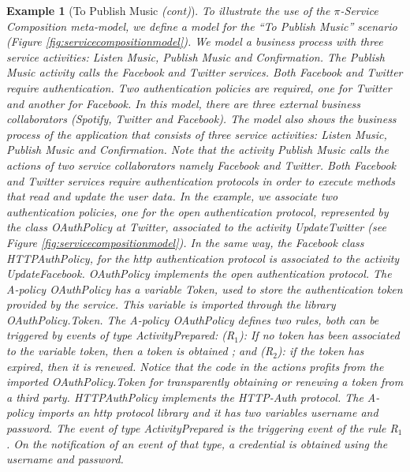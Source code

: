 \documentclass[12pt,twoside]{article}
\theoremstyle{plain}
\theoremstyle{plain}
\newtheorem{example}{Example}
\begin{document}
\begin{multicols}{2}
\begin{example}[To Publish Music \textit{(cont)}]\label{ex:toPublicMusic4}
To illustrate the use of the $\pi$-Service Composition meta-model, we define a model for the ``To Publish Music'' scenario (Figure \ref{fig:servicecompositionmodel}).
 We model a business process with three service activities: {\em Listen Music}, {\em Publish Music} and {\em Confirmation}.
The {\em Publish Music} activity calls the {\em Facebook} and {\em Twitter} services.
Both {\em Facebook} and {\em Twitter} require authentication.
Two authentication policies are required, one for {\em Twitter} and another for {\em Facebook}.
In this model, there are three external business collaborators ({\em Spotify, Twitter} and {\em Facebook}).
The model also shows the business process of the application that consists of three service activities: {\em Listen Music}, {\em Publish Music} and {\em Confirmation}.
Note that  the activity {\em Publish Music} calls the actions of two service collaborators namely {\em Facebook} and {\em Twitter}.
Both {\em Facebook} and {\em Twitter} services require authentication protocols in order to execute methods that read and update the user data.
In the example, we  associate two authentication policies, one for the open authentication protocol, represented by the class {\sf\small OAuthPolicy} at {\em Twitter}, associated to the activity  {\sf\small UpdateTwitter} (see Figure \ref{fig:servicecompositionmodel}).
In the same way, the {\em Facebook} class {\sf\small HTTPAuthPolicy}, for the http authentication protocol is associated to the activity {\sf\small UpdateFacebook}.
{\sf\small OAuthPolicy} implements the open authentication protocol.
The {\em A-policy} {\sf\small OAuthPolicy} has a variable {\sf\small Token}, used to store the authentication token provided by the service.
This variable is imported through the library {\sf\small OAuthPolicy.Token}.
The A-policy {\sf\small OAuthPolicy} defines two rules, both can be triggered by events of type {\sf\small ActivityPrepared}: (R$_1$): If no token has been associated to the variable {\sf\small token}, then a token is obtained ; and (R$_2$): if the token has expired, then it is renewed.
Notice that the code in the actions profits from the imported {\sf\small OAuthPolicy.Token} for transparently obtaining or renewing a token from a third party.
{\sf\small HTTPAuthPolicy} implements the HTTP-Auth protocol.
The A-policy imports an http protocol library and it has two variables {\sf\small username} and {\sf\small password}.
The event of type {\sf\small ActivityPrepared} is the triggering event of the rule {\sf\small R$_1$}.
On the notification of an event of that type, a credential is obtained using the username and password.
\end{example}


\end{multicols}
\end{document}
